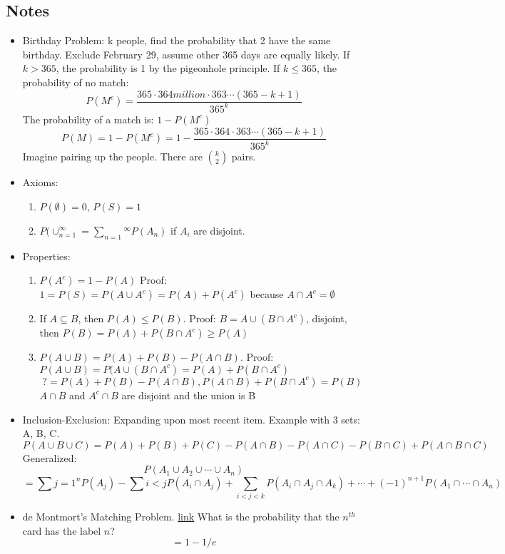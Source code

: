 \documentclass[11pt, oneside]{article}   	%
\begin{document}
	\subsection{Notes}
	\begin{itemize}
		\item Birthday Problem: k people, find the probability that 2 have the same birthday. Exclude February 29, assume other 365 days are equally likely.
			If $k > 365$, the probability is 1 by the pigeonhole principle.
			If $k \leq 365$, the probability of no match:
				\[
					P(M^c)= \frac{365 \cdot 364 million\cdot 363 \cdots (365 - k + 1)}{365^k}
				\]
			The probability of a match is: $1 - P(M^c)$
				\[
					P(M) = 1 - P(M^c) = 1 - \frac{365 \cdot 364 \cdot 363 \cdots (365 - k + 1)}{365^k}
				\]
			Imagine pairing up the people. There are $\binom{k}{2}$ pairs.
		\item Axioms:
			\begin{enumerate}
				\item $P(\emptyset) = 0$, $P(S) = 1$
				\item $P( \cup_{n=1}^{\infty} = \sum_{n=1}{^\infty}P(A_n)$ if $A_i$ are disjoint.
			\end{enumerate}
		\item Properties:
			\begin{enumerate}
				\item $P(A^c) = 1 - P(A)$ Proof: $1 = P(S) = P(A \cup A^c) = P(A) + P(A^c)$ because $A \cap A^c = \emptyset$
				\item If $ A \subseteq B$, then $P(A) \leq P(B)$. Proof: $B = A \cup (B \cap A^c)$, disjoint, then $P(B) = P(A) + P(B \cap A^c) \geq P(A)$
				\item $P(A \cup B) = P(A) + P(B) - P(A \cap B)$. Proof: $P(A \cup B) = P(A \cup ( B \cap A^c ) = P(A) + P(B \cap A^c)$
					\[
					 	?= P(A) + P(B) - P(A \cap B), P(A \cap B) + P(B \cap A^c) = P(B)
					\]
					$A \cap B$ and $A^c \cap B$ are disjoint and the union is B
			\end{enumerate}
		\item Inclusion-Exclusion: Expanding upon most recent item. Example with 3 sets: A, B, C.
			\[
				P(A \cup B \cup C) = P(A) + P(B) + P(C) - P(A \cap B) - P(A \cap C) - P(B \cap C) + P(A \cap B \cap C)
			\]
			Generalized:
			\[
				P(A_1 \cup A_2 \cup \cdots \cup A_n)
			\]
			\[
				= \sum{j=1}^{n}P(A_j) - \sum{i < j}P(A_i \cap A_j) + \sum_{i < j < k}P(A_i \cap A_j \cap A_k) + \cdots + (-1)^{n+1}P(A_1 \cap \cdots \cap A_n)
			\]
		\item de Montmort's Matching Problem. \href{http://www.math.uah.edu/stat/urn/Matching.html}{link}
			What is the probability that the $n^{th}$ card has the label $n$?
			\[
				= 1 - 1/e
			\]
	\end{itemize}
\end{document}
